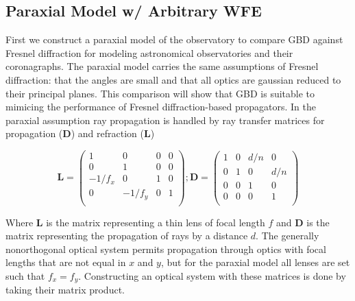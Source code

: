 

\subsection{Paraxial Model w/ Arbitrary WFE}

First we construct a paraxial model of the observatory to compare GBD against Fresnel diffraction for modeling astronomical observatories and their coronagraphs. The paraxial model carries the same assumptions of Fresnel diffraction: that the angles are small and that all optics are gaussian  reduced to their principal planes\cite{goodman17}. This comparison will show that GBD is suitable to mimicing the performance of Fresnel diffraction-based propagators. In the paraxial assumption ray propagation is handled by ray transfer matrices for propagation ($\textbf{D}$) and refraction ($\textbf{L}$)\cite{Ashcraft2020} 

\begin{equation}
    \mathbf{L} = 
    \begin{pmatrix}
    1 & 0 & 0 & 0 \\
    0 & 1 & 0 & 0 \\
    -1/f_x & 0 & 1 & 0 \\
    0 & -1/f_y & 0 & 1 \\
    \end{pmatrix}
    ;                
    \mathbf{D} = 
    \begin{pmatrix}
    1 & 0 & d/n & 0 \\
    0 & 1 & 0 & d/n \\
    0 & 0 & 1 & 0 \\
    0 & 0 & 0 & 1 \\
    \end{pmatrix}
\end{equation}

Where $\mathbf{L}$ is the matrix representing a thin lens of focal length $f$ and $\mathbf{D}$ is the matrix representing the propagation of rays by a distance $d$. The generally nonorthogonal optical system permits propagation through optics with focal lengths that are not equal in $x$ and $y$, but for the paraxial model all lenses are set such that $f_x = f_y$. Constructing an optical system with these matrices is done by taking their matrix product.

